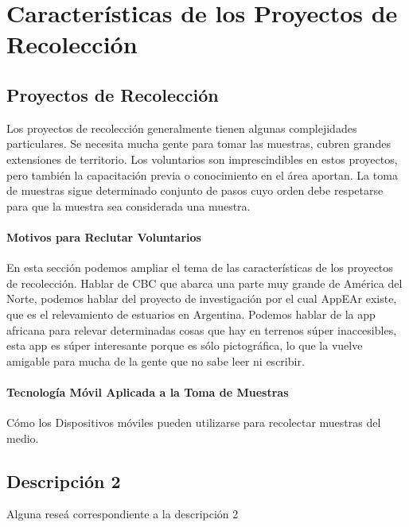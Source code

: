 \chapter{Características de los Proyectos de Recolección}

\section{Proyectos de Recolección}
Los proyectos de recolección generalmente tienen algunas complejidades particulares. Se necesita mucha gente para tomar las muestras, cubren grandes extensiones de territorio. Los voluntarios son imprescindibles en estos proyectos, pero también la capacitación previa o conocimiento en el área aportan. La toma de muestras sigue determinado conjunto de pasos cuyo orden debe respetarse para que la muestra sea considerada una muestra. 
\subsubsection{Motivos para Reclutar Voluntarios}	
En esta sección podemos ampliar el tema de las características de los proyectos de recolección. Hablar de CBC que abarca una parte muy grande de América del Norte, podemos hablar del proyecto de investigación por el cual AppEAr existe, que es el relevamiento de estuarios en Argentina. Podemos hablar de la app africana para relevar determinadas cosas que hay en terrenos súper inaccesibles, esta app es súper interesante porque es sólo pictográfica, lo que la vuelve amigable para mucha de la gente que no sabe leer ni escribir. 
\subsubsection{Tecnología Móvil Aplicada a la Toma de Muestras}	
Cómo los Dispositivos móviles pueden utilizarse para recolectar muestras del medio. 

\section{Descripción 2}
Alguna reseá correspondiente a la descripción 2





